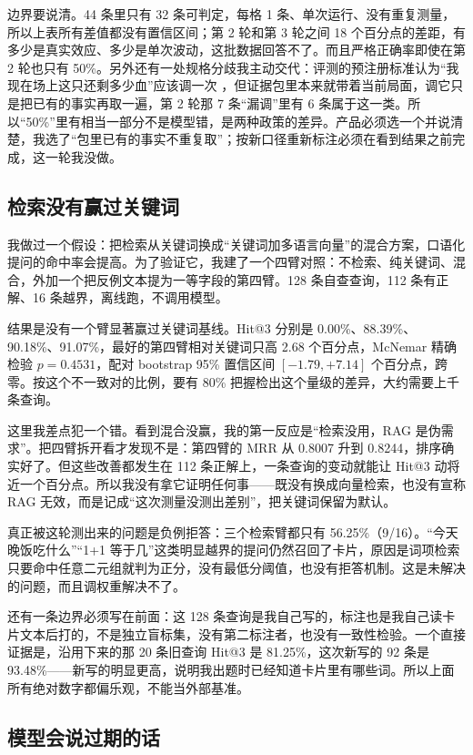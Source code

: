 边界要说清。44 条里只有 32 条可判定，每格 1 条、单次运行、没有重复测量，所以上表所有差值都没有置信区间；第 2 轮和第 3 轮之间 18 个百分点的差距，有多少是真实效应、多少是单次波动，这批数据回答不了。而且严格正确率即使在第 2 轮也只有 50\%。另外还有一处规格分歧我主动交代：评测的预注册标准认为“我现在场上这只还剩多少血”应该调一次 ，但证据包里本来就带着当前局面，调它只是把已有的事实再取一遍，第 2 轮那 7 条“漏调”里有 6 条属于这一类。所以“50\%”里有相当一部分不是模型错，是两种政策的差异。产品必须选一个并说清楚，我选了“包里已有的事实不重复取”；按新口径重新标注必须在看到结果之前完成，这一轮我没做。

\subsection{检索没有赢过关键词}

我做过一个假设：把检索从关键词换成“关键词加多语言向量”的混合方案，口语化提问的命中率会提高。为了验证它，我建了一个四臂对照：不检索、纯关键词、混合，外加一个把反例文本提为一等字段的第四臂。128 条自查查询，112 条有正解、16 条越界，离线跑，不调用模型。

结果是没有一个臂显著赢过关键词基线。Hit@3 分别是 0.00\%、88.39\%、90.18\%、91.07\%，最好的第四臂相对关键词只高 2.68 个百分点，McNemar 精确检验 $p = 0.4531$，配对 bootstrap 95\% 置信区间 $[-1.79, +7.14]$ 个百分点，跨零。按这个不一致对的比例，要有 80\% 把握检出这个量级的差异，大约需要上千条查询。

这里我差点犯一个错。看到混合没赢，我的第一反应是“检索没用，RAG 是伪需求”。把四臂拆开看才发现不是：第四臂的 MRR 从 0.8007 升到 0.8244，排序确实好了。但这些改善都发生在 112 条正解上，一条查询的变动就能让 Hit@3 动将近一个百分点。所以我没有拿它证明任何事——既没有换成向量检索，也没有宣称 RAG 无效，而是记成“这次测量没测出差别”，把关键词保留为默认。

真正被这轮测出来的问题是负例拒答：三个检索臂都只有 56.25\%（9/16）。“今天晚饭吃什么”“1+1 等于几”这类明显越界的提问仍然召回了卡片，原因是词项检索只要命中任意二元组就判为正分，没有最低分阈值，也没有拒答机制。这是未解决的问题，而且调权重解决不了。

还有一条边界必须写在前面：这 128 条查询是我自己写的，标注也是我自己读卡片文本后打的，不是独立盲标集，没有第二标注者，也没有一致性检验。一个直接证据是，沿用下来的那 20 条旧查询 Hit@3 是 81.25\%，这次新写的 92 条是 93.48\%——新写的明显更高，说明我出题时已经知道卡片里有哪些词。所以上面所有绝对数字都偏乐观，不能当外部基准。

\subsection{模型会说过期的话}

